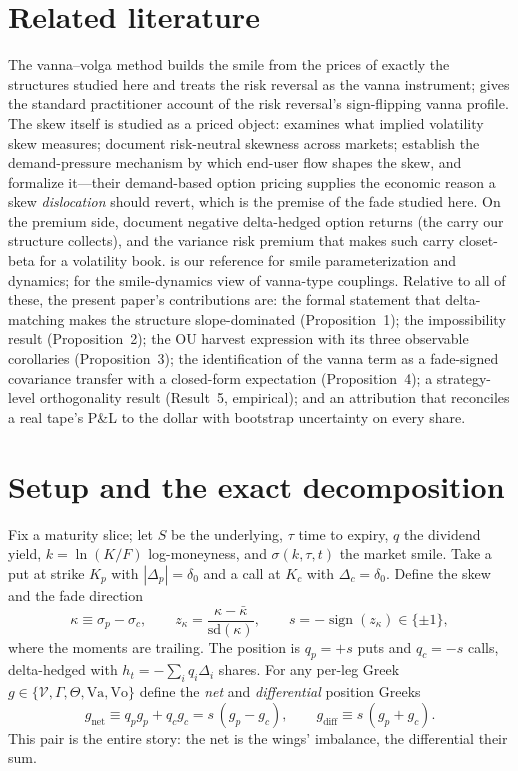 \documentclass[11pt]{article}
\newcommand{\Va}{\mathrm{Va}}
\begin{document}
\section{Related literature}
The vanna--volga method \citep{cm} builds the smile from the prices of exactly the structures
studied here and treats the risk reversal as the vanna instrument; \citet{sinclair} gives the
standard practitioner account of the risk reversal's sign-flipping vanna profile. The skew
itself is studied as a priced object: \citet{mixon} examines what implied volatility skew
measures; \citet{dm} document risk-neutral skewness across markets; \citet{bw} establish the
demand-pressure mechanism by which end-user flow shapes the skew, and \citet{gpp} formalize
it---their demand-based option pricing supplies the economic reason a skew \emph{dislocation}
should revert, which is the premise of the fade studied here. On the premium side,
\citet{bakshi} document negative delta-hedged option returns (the carry our structure
collects), and \citet{carrwu} the variance risk premium that makes such carry closet-beta for
a volatility book. \citet{gatheral} is our reference for smile parameterization and
dynamics; \citet{bergomi} for the smile-dynamics view of vanna-type couplings. Relative to all
of these, the present paper's contributions are: the formal statement that delta-matching
makes the structure slope-dominated (Proposition~1); the impossibility result
(Proposition~2); the OU harvest expression with its three observable corollaries
(Proposition~3); the identification of the vanna term as a fade-signed covariance transfer
with a closed-form expectation
(Proposition~4); a strategy-level orthogonality result (Result~5, empirical); and an attribution
that reconciles a real tape's P\&L to the dollar with bootstrap uncertainty on every share.

\section{Setup and the exact decomposition}\label{sec:setup}
Fix a maturity slice; let $S$ be the underlying, $\tau$ time to expiry, $q$ the dividend
yield, $k = \ln(K/F)$ log-moneyness, and $\sigma(k, \tau, t)$ the market smile. Take a put at
strike $K_p$ with $|\Delta_p| = \delta_0$ and a call at $K_c$ with $\Delta_c = \delta_0$.
Define the skew and the fade direction
\[ \kappa \equiv \sigma_p - \sigma_c, \qquad
   z_\kappa = \frac{\kappa - \bar\kappa}{\mathrm{sd}(\kappa)}, \qquad
   s = -\operatorname{sign}(z_\kappa) \in \{\pm 1\}, \]
where the moments are trailing. The position is $q_p = +s$ puts and $q_c = -s$ calls,
delta-hedged with $h_t = -\sum_i q_i \Delta_i$ shares. For any per-leg Greek
$g \in \{\mathcal V, \Gamma, \Theta, \Va, \mathrm{Vo}\}$ define the \emph{net} and
\emph{differential} position Greeks
\[ g_{\mathrm{net}} \equiv q_p g_p + q_c g_c = s\,(g_p - g_c), \qquad
   g_{\mathrm{diff}} \equiv s\,(g_p + g_c). \]
This pair is the entire story: the net is the wings' imbalance, the differential their sum.
\end{document}
